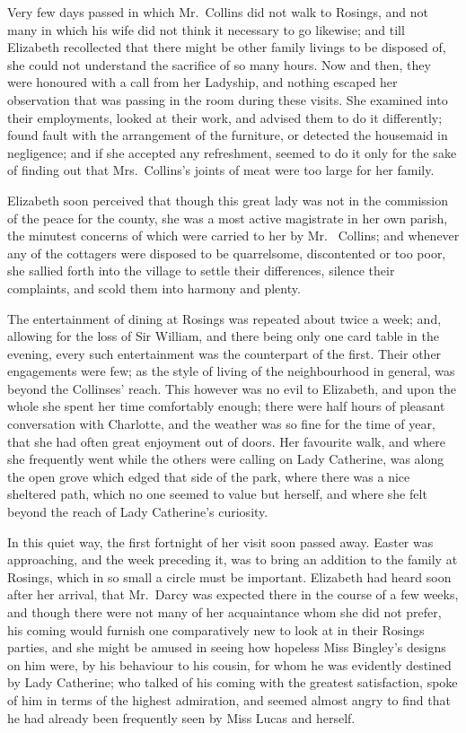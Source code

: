 Very few days passed in which Mr.\ Collins did not walk
to Rosings, and not many in which his wife did not think
it necessary to go likewise; and till Elizabeth recollected
that there might be other family livings to be disposed of,
she could not understand the sacrifice of so many hours.
Now and then, they were honoured with a call from her
Ladyship, and nothing escaped her observation that was
passing in the room during these visits. She examined
into their employments, looked at their work, and advised
them to do it differently; found fault with the arrangement
of the furniture, or detected the housemaid in
negligence; and if she accepted any refreshment, seemed
to do it only for the sake of finding out that Mrs.\ Collins’s
joints of meat were too large for her family.

Elizabeth soon perceived that though this great lady
was not in the commission of the peace for the county,
she was a most active magistrate in her own parish, the
minutest concerns of which were carried to her by Mr.\ %
Collins; and whenever any of the cottagers were disposed
to be quarrelsome, discontented or too poor, she sallied
forth into the village to settle their differences, silence
their complaints, and scold them into harmony and plenty.

The entertainment of dining at Rosings was repeated
about twice a week; and, allowing for the loss of Sir
William, and there being only one card table in the
evening, every such entertainment was the counterpart
of the first. Their other engagements were few; as the
style of living of the neighbourhood in general, was
beyond the Collinses’ reach. This however was no evil
to Elizabeth, and upon the whole she spent her time
comfortably enough; there were half hours of pleasant
conversation with Charlotte, and the weather was so fine
for the time of year, that she had often great enjoyment
out of doors. Her favourite walk, and where she frequently
went while the others were calling on Lady
Catherine, was along the open grove which edged that
side of the park, where there was a nice sheltered path,
which no one seemed to value but herself, and where she
felt beyond the reach of Lady Catherine’s curiosity.

In this quiet way, the first fortnight of her visit soon
passed away. Easter was approaching, and the week
preceding it, was to bring an addition to the family at
Rosings, which in so small a circle must be important.
Elizabeth had heard soon after her arrival, that Mr.\ Darcy
was expected there in the course of a few weeks, and
though there were not many of her acquaintance whom
she did not prefer, his coming would furnish one comparatively
new to look at in their Rosings parties, and she
might be amused in seeing how hopeless Miss Bingley’s
designs on him were, by his behaviour to his cousin, for
whom he was evidently destined by Lady Catherine;
who talked of his coming with the greatest satisfaction,
spoke of him in terms of the highest admiration, and
seemed almost angry to find that he had already been
frequently seen by Miss Lucas and herself.

